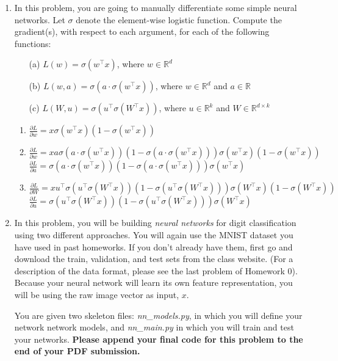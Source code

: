 \documentclass[10pt]{report}
\def\R{{\mathbb R}}
\def\R{{\mathbb R}}
\begin{document}
\begin{enumerate}
\item In this problem, you are going to manually differentiate some simple neural networks. Let $\sigma$ denote the element-wise logistic function. Compute the gradient(s), with respect to each argument, for each of the following functions:
\begin{enumerate}
    \item[(a)] $L(w) = \sigma(w^\top x)$, where $w \in \R^d$
    \item[(b)] $L(w, a) = \sigma(a \cdot \sigma(w^\top x))$, where $w \in \R^d$ and $a \in \R$
    \item[(c)] $L(W, u) = \sigma(u^\top \sigma(W^\top x))$, where $u \in \R^k$ and $W \in \R^{d \times k}$
\end{enumerate}
\begin{solution}
\begin{enumerate}
    \item $\frac{\partial L}{\partial w} = x\sigma(w^\top x)(1 - \sigma(w^\top x))$
    \item $\frac{\partial L}{\partial w} = xa\sigma(a\cdot \sigma(w^\top x))(1 - \sigma(a\cdot \sigma(w^\top x)))\sigma(w^\top x)(1 - \sigma(w^\top x))$ \\
    $\frac{\partial L}{\partial a} = \sigma(a\cdot \sigma(w^\top x))(1 - \sigma(a\cdot \sigma(w^\top x)))\sigma(w^\top x)$
    \item $\frac{\partial L}{\partial W} = xu^\top\sigma(u^\top\sigma(W^\top x))(1 - \sigma(u^\top \sigma(W^\top x)))\sigma(W^\top x)(1 - \sigma(W^\top x))$ \\
    $\frac{\partial L}{\partial u} = \sigma(u^\top\sigma(W^\top x))(1 - \sigma(u^\top \sigma(W^\top x)))\sigma(W^\top x)$
\end{enumerate}
\end{solution}


\item In this problem, you will be building {\em neural networks} for digit classification using two different approaches. You will again use the MNIST dataset you have used in past homeworks. If you don't already have them, first go and download the train, validation, and test sets from the class website. (For a description of the data format, please see the last problem of Homework 0). Because your neural network will learn its own feature representation, you will be using the raw image vector as input, $x$. 

You are given two skeleton files: \textit{nn\_models.py}, in which you will define your network network models, and \textit{nn\_main.py} in which you will train and test your networks. {\bf Please append your final code for this problem to the end of your PDF submission.}


\end{enumerate}
\end{document}

